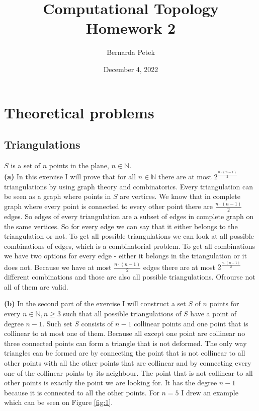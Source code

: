 \documentclass[12pt]{article}
\begin{document}
	
	
	
	
	\title{Computational Topology \\ Homework 2}
	\author{%
		Bernarda Petek} %
	
	\date{December 4, 2022}
	\maketitle
	
	\section{Theoretical problems}
	\subsection{Triangulations}
	$S$ is a set of $n$ points in the plane, $n \in \mathbb{N}$. \\
	
	
	 \textbf{(a)} In this exercise I will prove that for all $n \in \mathbb{N}$ there are at most $2^{\frac{n\cdot (n-1)}{2}}$ triangulations by using graph theory and combinatorics. Every triangulation can be seen as a graph where points in $S$ are vertices. We know that in complete graph where every point is connected to every other point there are $\frac{n\cdot (n-1)}{2}$ edges. So edges of every triangulation are a subset of edges in complete graph on the same vertices. So for every edge we can say that it either belongs to the triangulation or not. To get all possible triangulations we can look at all possible combinations of edges, which is a combinatorial problem. To get all combinations we have two options for every edge - either it belongs in the triangulation or it does not. Because we have at most $\frac{n\cdot (n-1)}{2}$ edges there are at most  $2^{\frac{n\cdot (n-1)}{2}}$ different combinations and those are also all possible triangulations. Ofcourse not all of them are valid.
	 
	 \textbf{(b)} In the second part of the exercise I will construct a set $S$ of $n$ points for every $n \in \mathbb{N}, n \geq 3$ such that all possible triangulations of $S$ have a point of degree $n-1$. Such set $S$ consists of $n-1$ collinear points and one point that is collinear to at most one of them. Because all except one point are collinear no three connected points can form a triangle that is not deformed. The only way triangles can be formed are by connecting the point that is not collinear to all other points with all the other points that are collinear and by connecting every one of the collinear points by its neighbour. The point that is not collinear to all other points is exactly the point we are looking for. It has the degree $n-1$ because it is connected to all the other points. For $n=5$ I drew an example which can be seen on Figure \ref{fig:1}.
	 
\end{document}
